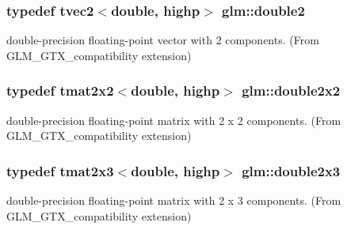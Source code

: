 \hypertarget{group__gtx__compatibility_ga490652005dad57a41887b974195f36c1}{}
\subsubsection[{double2}]{\setlength{\rightskip}{0pt plus 5cm}typedef tvec2$<$double, highp$>$ {\bf glm\+::double2}}\label{group__gtx__compatibility_ga490652005dad57a41887b974195f36c1}


double-\/precision floating-\/point vector with 2 components. (From G\+L\+M\+\_\+\+G\+T\+X\+\_\+compatibility extension) 

\hypertarget{group__gtx__compatibility_ga7651d80f2dcc222a2e229ce44af96f11}{}
\subsubsection[{double2x2}]{\setlength{\rightskip}{0pt plus 5cm}typedef tmat2x2$<$double, highp$>$ {\bf glm\+::double2x2}}\label{group__gtx__compatibility_ga7651d80f2dcc222a2e229ce44af96f11}


double-\/precision floating-\/point matrix with 2 x 2 components. (From G\+L\+M\+\_\+\+G\+T\+X\+\_\+compatibility extension) 

\hypertarget{group__gtx__compatibility_ga60ae0f5858d498b2e5b9bb8d23019db0}{}
\subsubsection[{double2x3}]{\setlength{\rightskip}{0pt plus 5cm}typedef tmat2x3$<$double, highp$>$ {\bf glm\+::double2x3}}\label{group__gtx__compatibility_ga60ae0f5858d498b2e5b9bb8d23019db0}


double-\/precision floating-\/point matrix with 2 x 3 components. (From G\+L\+M\+\_\+\+G\+T\+X\+\_\+compatibility extension) 

\hypertarget{group__gtx__compatibility_gadb90656f5faac0e800718a0a19bf0e03}{}
